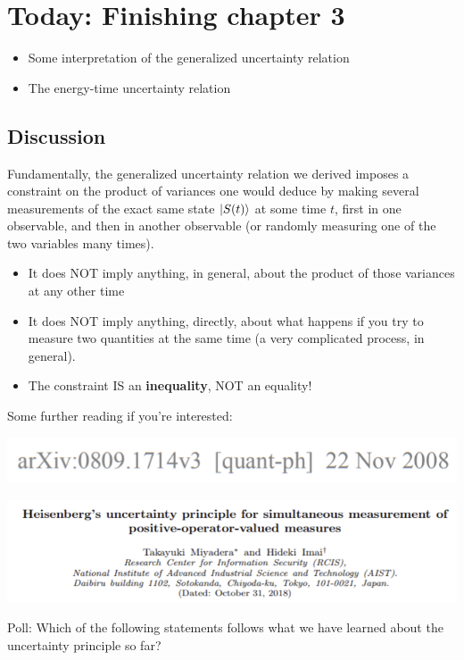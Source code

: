 \documentclass{article}
\begin{document}
\section{Today: Finishing chapter 3}

\begin{itemize}
    \item Some interpretation of the generalized uncertainty relation
    \item The energy-time uncertainty relation
\end{itemize}

\subsection{Discussion}

Fundamentally, the generalized uncertainty relation we derived imposes a constraint on the product of variances one would deduce by making several measurements of the exact same state $\ket{S(t)}$ at some time $t$, first in one observable, and then in another observable (or randomly measuring one of the two variables many times).  

\begin{itemize}
    \item It does NOT imply anything, in general, about the product of those variances at any other time
    \item It does NOT imply anything, directly, about what happens if you try to measure two quantities at the same time (a very complicated process, in general).
    \item The constraint IS an \textbf{inequality}, NOT an equality!
\end{itemize}

\hfill

Some further reading if you're interested:

\includegraphics[width = 0.5 \textwidth]{Lecture17/1.png}

\includegraphics[width = 0.5 \textwidth]{Lecture17/2.png}

Poll: Which of the following statements follows what we have learned about the uncertainty principle so far? 
\end{document}
